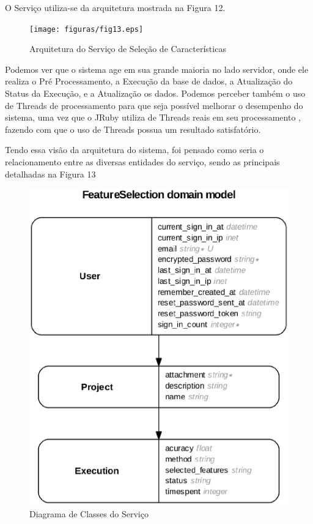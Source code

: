 O Serviço utiliza-se da arquitetura mostrada na Figura 12.

\begin{figure}[h]
	\centering
	\label{fig13}
		\texttt{[image: figuras/fig13.eps]}
	\caption{Arquitetura do Serviço de Seleção de Características}
\end{figure}

Podemos ver que o sistema age em sua grande maioria no lado servidor, onde ele realiza o Pré Processamento, a Execução da base de dados, a Atualização do Status da Execução, e a Atualização os dados. Podemos perceber também o uso de Threads de processamento para que seja possível melhorar o desempenho do sistema, uma vez que o JRuby utiliza de Threads reais em seu processamento \cite{jruby}, fazendo com que o uso de Threads possua um resultado satisfatório.

Tendo essa visão da arquitetura do sistema, foi pensado como seria o relacionamento entre as diversas entidades do serviço, sendo as principais detalhadas na Figura 13

\begin{figure}[H]
	\centering
	\label{fig14}
		\includegraphics[keepaspectratio=true,scale=0.35]{figuras/fig14.eps}
	\caption{Diagrama de Classes do Serviço}
\end{figure}

